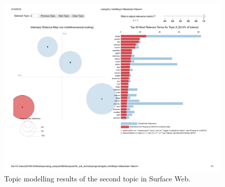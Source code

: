 
\begin{figure}[h!]
\begin{center}
\includegraphics[scale=0.4]{./img/codingALL_topic2.pdf}
\end{center}
\caption{Topic modelling results of the second topic in Surface Web.}
\label{fig:topicmodelling_2}
\end{figure}





